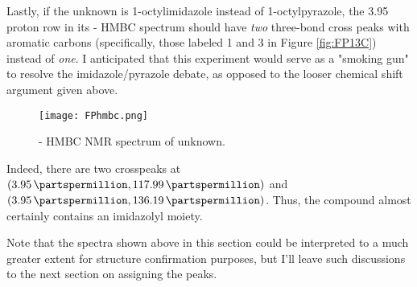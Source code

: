 \documentclass[titlepage]{article}
\begin{document}
Lastly, if the unknown is 1-octylimidazole instead of 1-octylpyrazole, the \SI{3.95}{\partspermillion} proton row in its - HMBC spectrum should have \emph{two} three-bond cross peaks with aromatic carbons (specifically, those labeled 1 and 3 in Figure \ref{fig:FP13C}) instead of \emph{one}. I anticipated that this experiment would serve as a "smoking gun" to resolve the imidazole/pyrazole debate, as opposed to the looser chemical shift argument given above.
\begin{figure}[H]
    \centering
    \texttt{[image: FPhmbc.png]}
    \caption{- HMBC NMR spectrum of unknown.}
    \label{fig:FPhmbc}
\end{figure}
Indeed, there are two crosspeaks at $(\SI{3.95}{\partspermillion},\SI{117.99}{\partspermillion})$ and $(\SI{3.95}{\partspermillion},\SI{136.19}{\partspermillion})$. Thus, the compound almost certainly contains an imidazolyl moiety.\par
Note that the spectra shown above in this section could be interpreted to a much greater extent for structure confirmation purposes, but I'll leave such discussions to the next section on assigning the peaks.
\newpage
\end{document}
